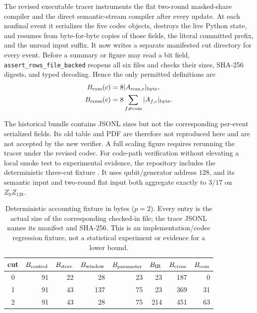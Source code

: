 \documentclass[aps,prx,reprint,floatfix,superscriptaddress]{revtex4-2}
\begin{document}
The revised executable tracer instruments the flat two-round masked-share
compiler and the direct semantic-stream compiler after every update.  At each
nonfinal event it serializes the five codec objects, destroys the live Python
state, and resumes from byte-for-byte copies of those fields, the literal
committed prefix, and the unread input suffix.  It now writes a separate
manifested cut directory for every event.  Before a summary or figure may read
a bit field, \texttt{assert\_rows\_file\_backed} reopens all six files and
checks their sizes, SHA-256 digests, and typed decoding.  Hence the only
permitted definitions are
\begin{equation*}
\begin{aligned}
 B_{\rm com}(c)&=8|A_{\rm com,c}|_{\rm byte},\\
 B_{\rm cross}(c)&=8\sum_{f\neq\mathrm{com}}|A_{f,c}|_{\rm byte}.
\end{aligned}
\end{equation*}

The historical  bundle contains JSONL sizes but not
the corresponding per-event serialized fields.  Its old table and PDF are
therefore not reproduced here and are not accepted by the new verifier.  A
full scaling figure requires rerunning the tracer under the revised codec.
For code-path verification without elevating a local smoke test to experimental
evidence, the repository includes the deterministic three-cut fixture
.  It uses qubit/generator address $128$,
and its semantic input and two-round flat input both aggregate exactly to
$3/17$ on $Z_0Z_{128}$.

\begin{table}[tbp]
\centering
\scriptsize
\begin{tabular}{c rrrrrr r}
\toprule
cut & $B_{\rm control}$ & $B_{\rm store}$ & $B_{\rm window}$ &
$B_{\rm parameter}$ & $B_{\rm IR}$ & $B_{\rm cross}$ & $B_{\rm com}$ \\
\midrule
0 & 91 & 22 & 28  & 23 & 23  & 187 & 0  \\
1 & 91 & 43 & 137 & 75 & 23  & 369 & 31 \\
2 & 91 & 43 & 28  & 75 & 214 & 451 & 63 \\
\bottomrule
\end{tabular}
\caption{Deterministic accounting fixture in bytes ($p=2$).  Every entry is
the actual size of the corresponding checked-in file; the trace JSONL names its
manifest and SHA-256.  This is an implementation/codec regression fixture, not
a statistical experiment or evidence for a lower bound.}
\label{tab:accounting-fixture}
\end{table}
\end{document}
